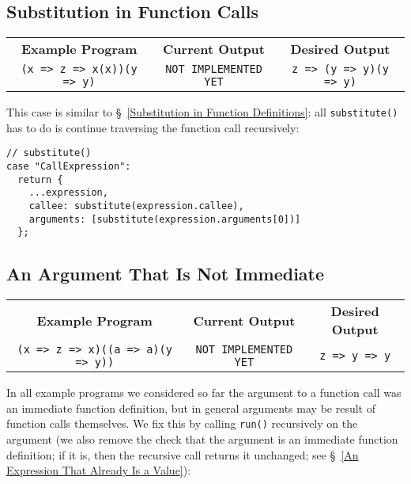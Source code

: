 \documentclass[12pt, oneside]{book}
\begin{document}
\subsection{Substitution in Function Calls}

\begin{center}
\begin{tabular}{c|c|c}
\textbf{Example Program} & \textbf{Current Output} & \textbf{Desired Output} \\
\texttt{(x => z => x(x))(y => y)} & \texttt{NOT IMPLEMENTED YET} & \texttt{z => (y => y)(y => y)} \\
\end{tabular}
\end{center}

\noindent This case is similar to §~\ref{Substitution in Function Definitions}: all \texttt{substitute()} has to do is continue traversing the function call recursively:

\begin{verbatim}
// substitute()
case "CallExpression":
  return {
    ...expression,
    callee: substitute(expression.callee),
    arguments: [substitute(expression.arguments[0])]
  };
\end{verbatim}

\subsection{An Argument That Is Not Immediate}
\label{An Argument That Is Not Immediate}

\begin{center}
\begin{tabular}{c|c|c}
\textbf{Example Program} & \textbf{Current Output} & \textbf{Desired Output} \\
\texttt{(x => z => x)((a => a)(y => y))} & \texttt{NOT IMPLEMENTED YET} & \texttt{z => y => y} \\
\end{tabular}
\end{center}

\noindent In all example programs we considered so far the argument to a function call was an immediate function definition, but in general arguments may be result of function calls themselves. We fix this by calling \texttt{run()} recursively on the argument (we also remove the check that the argument is an immediate function definition; if it is, then the recursive call returns it unchanged; see §~\ref{An Expression That Already Is a Value}):
\end{document}
